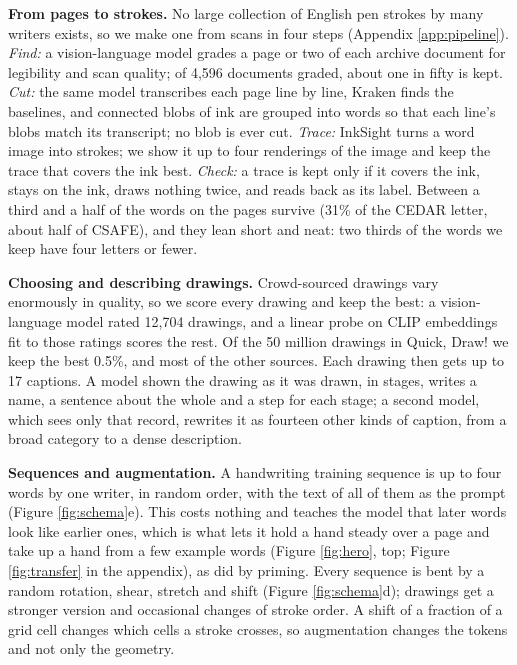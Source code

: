 \documentclass{article}
\begin{document}
\textbf{From pages to strokes.} No large collection of English pen strokes by many writers exists, so we make one from scans in four steps (Appendix \ref{app:pipeline}). \emph{Find:} a vision-language model grades a page or two of each archive document for legibility and scan quality; of 4,596 documents graded, about one in fifty is kept. \emph{Cut:} the same model transcribes each page line by line, Kraken \citep{kiessling2019kraken} finds the baselines, and connected blobs of ink are grouped into words so that each line's blobs match its transcript; no blob is ever cut. \emph{Trace:} InkSight \citep{mitrevski2024inksight} turns a word image into strokes; we show it up to four renderings of the image and keep the trace that covers the ink best. \emph{Check:} a trace is kept only if it covers the ink, stays on the ink, draws nothing twice, and reads back as its label. Between a third and a half of the words on the pages survive (31\% of the CEDAR letter, about half of CSAFE), and they lean short and neat: two thirds of the words we keep have four letters or fewer.

\textbf{Choosing and describing drawings.} Crowd-sourced drawings vary enormously in quality, so we score every drawing and keep the best: a vision-language model rated 12,704 drawings, and a linear probe on CLIP embeddings \citep{radford2021learning,schuhmann2022laion} fit to those ratings scores the rest. Of the 50 million drawings in Quick, Draw! we keep the best 0.5\%, and most of the other sources. Each drawing then gets up to 17 captions. A model shown the drawing as it was drawn, in stages, writes a name, a sentence about the whole and a step for each stage; a second model, which sees only that record, rewrites it as fourteen other kinds of caption, from a broad category to a dense description.

\textbf{Sequences and augmentation.} A handwriting training sequence is up to four words by one writer, in random order, with the text of all of them as the prompt (Figure \ref{fig:schema}e). This costs nothing and teaches the model that later words look like earlier ones, which is what lets it hold a hand steady over a page and take up a hand from a few example words (Figure \ref{fig:hero}, top; Figure \ref{fig:transfer} in the appendix), as \citet{graves2014generating} did by priming. Every sequence is bent by a random rotation, shear, stretch and shift (Figure \ref{fig:schema}d); drawings get a stronger version and occasional changes of stroke order. A shift of a fraction of a grid cell changes which cells a stroke crosses, so augmentation changes the tokens and not only the geometry.
\end{document}
